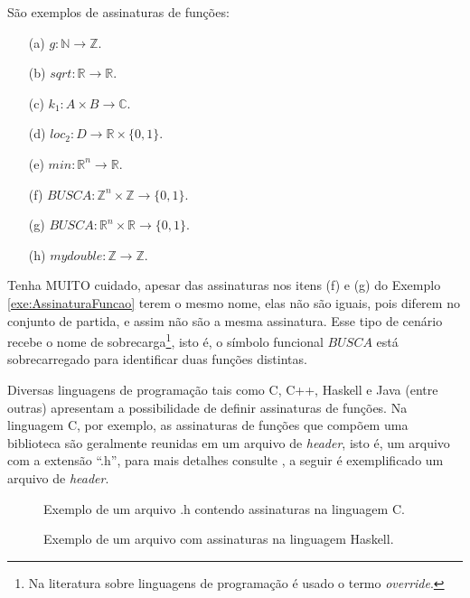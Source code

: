 \begin{exemplo}\label{exe:AssinaturaFuncao}
	São exemplos de assinaturas de funções:
	\begin{itemize}
		\item[(a)] $g : \mathbb{N} \rightarrow \mathbb{Z}$.
		\item[(b)] $sqrt : \mathbb{R} \rightarrow \mathbb{R}$.
		\item[(c)] $k_1 : A \times B \rightarrow \mathbb{C}$.
		\item[(d)] $loc_2 : D \rightarrow \mathbb{R} \times \{0,1\}$.
		\item[(e)] $min : \mathbb{R}^n \rightarrow \mathbb{R}$.
		\item[(f)] $BUSCA : \mathbb{Z}^n \times \mathbb{Z} \rightarrow \{0,1\}$.
		\item[(g)] $BUSCA : \mathbb{R}^n \times \mathbb{R} \rightarrow \{0,1\}$.
    \item[(h)] $mydouble: \mathbb{Z} \rightarrow \mathbb{Z}$.
	\end{itemize}
\end{exemplo}

\begin{cuidado}
  {\color{red}Tenha MUITO cuidado}, apesar das assinaturas nos itens (f) e (g) do Exemplo \ref{exe:AssinaturaFuncao} terem o mesmo nome, elas não são iguais, pois diferem no conjunto de partida, e assim não são a mesma assinatura. Esse tipo de cenário recebe o nome de sobrecarga\footnote{Na literatura sobre linguagens de programação é usado o termo \textit{override}.}, isto é, o símbolo funcional $BUSCA$ está sobrecarregado para identificar duas funções distintas.
\end{cuidado}

Diversas linguagens de programação tais como C, C++, Haskell e Java (entre outras) apresentam a possibilidade de definir assinaturas de funções. Na linguagem C, por exemplo, as assinaturas de funções que compõem uma biblioteca são geralmente reunidas em um arquivo de \textit{header}, isto é, um arquivo com a extensão ``.h'', para mais detalhes consulte \cite{paulo2009algoritmos}, a seguir é exemplificado um arquivo de \textit{header}.

\begin{figure}[h]
	
	\caption{Exemplo de um arquivo .h contendo assinaturas na linguagem C.}
	\label{fig:AssinaturasEmC}
\end{figure}

\begin{figure}[h]
	
	\caption{Exemplo de um arquivo com assinaturas na linguagem Haskell.}
	\label{fig:AssinaturasEmHaskell}
\end{figure}

